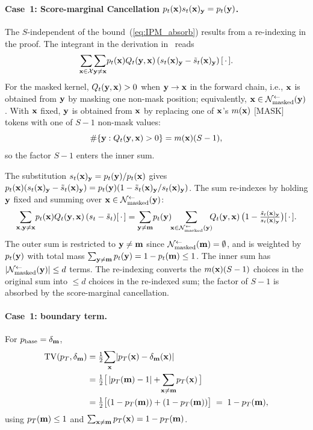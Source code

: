 \documentclass{article} %
\def\eqref#1{equation~\ref{#1}}
\newcommand{\bfx}{{\bf x}}
\newcommand{\bfy}{ {\bf y}}
\newcommand{\bfm}{{\bf m}}
\newcommand{\TV}{\mathrm{TV}}
\newcommand{\mask}{\text{[MASK]}}
\renewcommand{\eqref}[1]{\textup{(\ref{#1})}}
\newcommand{\Nmasked}{\mathcal{N}^{\leftarrow}_{\text{masked}}}
\begin{document}
\paragraph{Case~1: Score-marginal Cancellation
$p_t(\bfx)s_t(\bfx)_\bfy = p_t(\bfy)$.} The $S$-independent of the bound~\eqref{eq:IPM_absorb} results from a re-indexing in the
proof. The integrant in the derivation in~ reads
\begin{equation}
\sum_{\bfx \in \mathcal{X}}\!\sum_{\bfy \ne \bfx}\!p_t(\bfx) Q_t(\bfy, \bfx)\,(s_t(\bfx)_\bfy - \tilde s_t(\bfx)_\bfy)\,[\,\cdot\,].
\end{equation}
For the masked kernel, $Q_t(\bfy, \bfx) > 0$ when $\bfy \to \bfx$ in
the forward chain, i.e., $\bfx$ is obtained from $\bfy$ by masking one
non-mask position; equivalently, $\bfx \in \Nmasked(\bfy)$. With
$\bfx$ fixed, $\bfy$ is obtained from $\bfx$ by replacing one of $\bfx$'s
$m(\bfx)$ $\mask$ tokens with one of $S - 1$ non-mask values:
\begin{equation}
\#\{\bfy : Q_t(\bfy, \bfx) > 0\} = m(\bfx)(S - 1),
\end{equation}
so the factor $S - 1$ enters the inner sum.

The substitution $s_t(\bfx)_\bfy = p_t(\bfy)/p_t(\bfx)$ gives
$p_t(\bfx)(s_t(\bfx)_\bfy - \tilde s_t(\bfx)_\bfy) = p_t(\bfy)(1 -
\tilde s_t(\bfx)_\bfy/s_t(\bfx)_\bfy)$. The sum re-indexes by holding
$\bfy$ fixed and summing over $\bfx \in \Nmasked(\bfy)$:
\begin{equation}
\sum_{\bfx, \bfy \ne \bfx}\!p_t(\bfx) Q_t(\bfy, \bfx)\,(s_t - \tilde s_t)[\,\cdot\,]
= \sum_{\bfy \ne \bfm}\!p_t(\bfy)\!\!\sum_{\bfx \in \Nmasked(\bfy)}\!\!\!Q_t(\bfy, \bfx)\,\big(1 - \tfrac{\tilde s_t(\bfx)_\bfy}{s_t(\bfx)_\bfy}\big)[\,\cdot\,].
\end{equation}
The outer sum is restricted to $\bfy \ne \bfm$ since $\Nmasked(\bfm)
= \emptyset$, and is weighted by $p_t(\bfy)$ with total mass
$\sum_{\bfy \ne \bfm} p_t(\bfy) = 1 - p_t(\bfm) \le 1$. The inner sum
has $|\Nmasked(\bfy)| \le d$ terms. The re-indexing converts the
$m(\bfx)(S - 1)$ choices in the original sum into $\le d$ choices in the
re-indexed sum; the factor of $S - 1$ is absorbed by the score-marginal
cancellation.

\paragraph{Case~1: boundary term.} For $p_{\rm base} = \delta_{\bfm}$,
\begin{align*}
  \TV(p_T, \delta_\bfm)
  &= \tfrac{1}{2}\!\sum_{\bfx}\!|p_T(\bfx) - \delta_\bfm(\bfx)| \\
  &= \tfrac{1}{2}\big[\,|p_T(\bfm) - 1| + \!\sum_{\bfx \ne \bfm}\!p_T(\bfx)\,\big] \\
  &= \tfrac{1}{2}\big[(1 - p_T(\bfm)) + (1 - p_T(\bfm))\big]
  \;=\; 1 - p_T(\bfm),
\end{align*}
using $p_T(\bfm) \le 1$ and $\sum_{\bfx \ne \bfm}p_T(\bfx) = 1 - p_T(\bfm)$.
\end{document}
